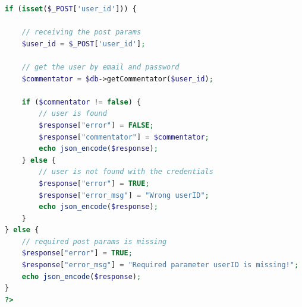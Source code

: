 \documentclass{article}
\begin{document}
\begin{landscape}
\begin{lstlisting}[language=PHP,basicstyle=\tiny,showstringspaces=false]
if (isset($_POST['user_id'])) {
 
    // receiving the post params
    $user_id = $_POST['user_id'];
 
    // get the user by email and password
    $commentator = $db->getCommentator($user_id);
 
    if ($commentator != false) {
        // user is found
        $response["error"] = FALSE;
        $response["commentator"] = $commentator;
        echo json_encode($response);
    } else {
        // user is not found with the credentials
        $response["error"] = TRUE;
        $response["error_msg"] = "Wrong userID";
        echo json_encode($response);
    }
} else {
    // required post params is missing
    $response["error"] = TRUE;
    $response["error_msg"] = "Required parameter userID is missing!";
    echo json_encode($response);
}
?>
\end{lstlisting}
\end{landscape}
\end{document}
